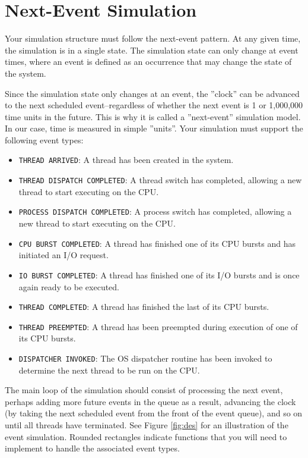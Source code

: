 \documentclass[main.tex]{subfiles}
\begin{document}
\section{Next-Event Simulation}
\label{sec:ne-sim}
Your simulation structure must follow the next-event pattern. At any given time, the simulation is in a single
state. The simulation state can only change at event times, where an event is defined as an occurrence
that may change the state of the system.

Since the simulation state only changes at an event, the ”clock” can be advanced to the next scheduled
event–regardless of whether the next event is 1 or 1,000,000 time units in the future. This is why it is called
a ”next-event” simulation model. In our case, time is measured in simple ”units”.
Your simulation must support the following event types:

\begin{itemize}
    \item \texttt{THREAD ARRIVED}: A thread has been created in the system.
    \item \texttt{THREAD DISPATCH COMPLETED}: A thread switch has completed, allowing a new thread to start executing on the CPU.
    \item \texttt{PROCESS DISPATCH COMPLETED}: A process switch has completed, allowing a new thread to start executing on the CPU.
    \item \texttt{CPU BURST COMPLETED}: A thread has finished one of its CPU bursts and has initiated an I/O request.
    \item \texttt{IO BURST COMPLETED}: A thread has finished one of its I/O bursts and is once again ready to be executed.
    \item \texttt{THREAD COMPLETED}: A thread has finished the last of its CPU bursts.
    \item \texttt{THREAD PREEMPTED}: A thread has been preempted during execution of one of its CPU bursts.
    \item \texttt{DISPATCHER INVOKED}: The OS dispatcher routine has been invoked to determine the next thread to be run on the CPU.
\end{itemize}

The main loop of the simulation should consist of processing the next event, perhaps adding more future
events in the queue as a result, advancing the clock (by taking the next scheduled event from the front of
the event queue), and so on until all threads have terminated. See Figure \ref{fig:des} for an illustration of the event simulation. Rounded rectangles indicate functions that you will need to implement to handle the associated event types.
\end{document}
